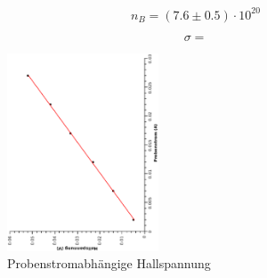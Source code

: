 \documentclass[12pt,a4paper,twopage]{article}
\begin{document}
\begin{center}
$$ \boxed{ n_{B} = (7.6 \pm 0.5) \cdot 10^{20}  } $$
\end{center}

$$ \sigma = $$



\pagebreak

\begin{figure}[H]
\begin{center}
\includegraphics[width=0.4\textwidth, angle=-90]{probenstrom.eps}
\caption{Probenstromabhängige Hallspannung}
\end{center}
\end{figure}
\end{document}
